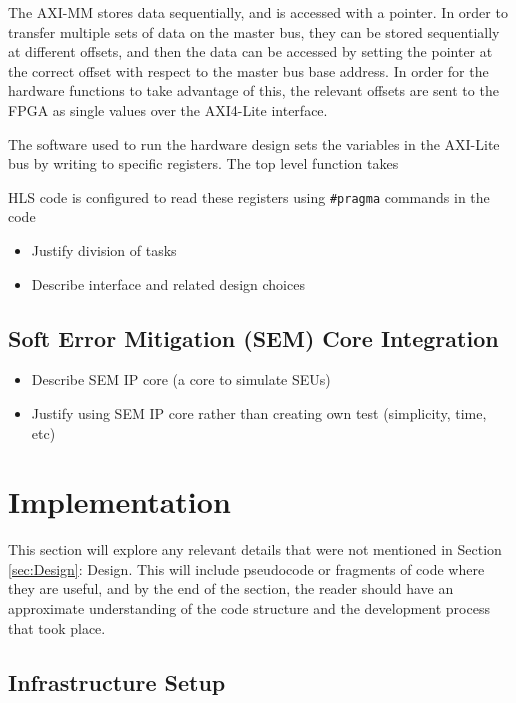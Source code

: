 \documentclass[12pt]{article}
\begin{document}
The AXI-MM stores data sequentially, and is accessed with a pointer. In order to transfer multiple sets of data on the master bus, they can be stored sequentially at different offsets, and then the data can be accessed by setting the pointer at the correct offset with respect to the master bus base address. In order for the hardware functions to take advantage of this, the relevant offsets are sent to the FPGA as single values over the AXI4-Lite interface.

The software used to run the hardware design sets the variables in the AXI-Lite bus by writing to specific registers. The top level function takes 

HLS code is configured to read these registers using \lstinline|#pragma| commands in the code 

\begin{itemize}
\item Justify division of tasks
\item Describe interface and related design choices
\end{itemize}

\subsection{Soft Error Mitigation (SEM) Core Integration}
\label{sec:Design-SEM}

\begin{itemize}
\item Describe SEM IP core (a core to simulate SEUs)
\item Justify using SEM IP core rather than creating own test (simplicity, time, etc)
\end{itemize}

\newpage

\section{Implementation}
\label{sec:Imp}


This section will explore any relevant details that were not mentioned in Section \ref{sec:Design}: Design. This will include pseudocode or fragments of code where they are useful, and by the end of the section, the reader should have an approximate understanding of the code structure and the development process that took place.

\subsection{Infrastructure Setup}
\label{sec:Imp-InfSetup}
\end{document}
